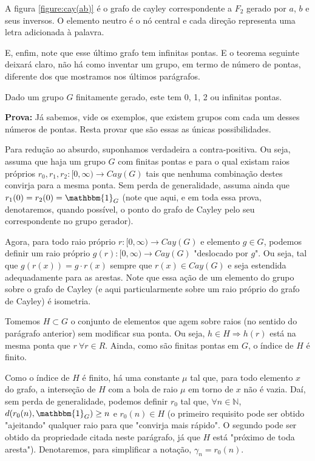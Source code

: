 A figura \ref{figure:cay(ab)} é o grafo de cayley correspondente a $F_2$ gerado por $a$, $b$ e seus inversos. O elemento neutro é o nó central e cada direção representa uma letra adicionada à palavra.



E, enfim, note que esse último grafo tem infinitas pontas. E o teorema seguinte deixará claro, não há como inventar um grupo, em termo de número de pontas, diferente dos que mostramos nos últimos parágrafos.

\begin{theorem}
Dado um grupo $G$ finitamente gerado, este tem 0, 1, 2 ou infinitas pontas.

\textbf{Prova:} Já sabemos, vide os exemplos, que existem grupos com cada um desses números de pontas. Resta provar que são essas as únicas possibilidades.

Para redução ao absurdo, suponhamos verdadeira a contra-positiva. Ou seja, assuma que haja um grupo $G$ com finitas pontas e para o qual existam raios próprios $r_0, r_1, r_2 : [0, \infty) \rightarrow Cay(G)$ tais que nenhuma combinação destes convirja para a mesma ponta. Sem perda de generalidade, assuma ainda que $r_1(0) = r_2(0) = \mathbbm{1}_G$ (note que aqui, e em toda essa prova, denotaremos, quando possível, o ponto do grafo de Cayley pelo seu correspondente no grupo gerador).

Agora, para todo raio próprio $r : [0, \infty) \rightarrow Cay(G)$ e elemento $g \in G$, podemos definir um raio próprio $g(r) : [0, \infty) \rightarrow Cay(G)$ "deslocado por $g$". Ou seja, tal que $g(r(x)) = g \cdot r(x)$ sempre que $r(x) \in Cay(G)$ e seja estendida adequadamente para as arestas. Note que essa ação de um elemento do grupo sobre o grafo de Cayley (e aqui particularmente sobre um raio próprio do grafo de Cayley) é isometria.

Tomemos $H \subset G$ o conjunto de elementos que agem sobre raios (no sentido do parágrafo anterior) sem modificar sua ponta. Ou seja, $h \in H \Rightarrow h(r)$ está na mesma ponta que $r \ \forall r \in R$. Ainda, como são finitas pontas em $G$, o índice de $H$ é finito.

Como o índice de $H$ é finito, há uma constante $\mu$ tal que, para todo elemento $x$ do grafo, a interseção de $H$ com a bola de raio $\mu$ em torno de $x$ não é vazia. Daí, sem perda de generalidade, podemos definir $r_0$ tal que, $\forall n \in \mathbb{N}$, $d(r_0(n), \mathbbm{1}_G) \geq n$ e $r_0(n) \in H$ (o primeiro requisito pode ser obtido "ajeitando" qualquer raio para que "convirja mais rápido". O segundo pode ser obtido da propriedade citada neste parágrafo, já que $H$ está "próximo de toda aresta"). Denotaremos, para simplificar a notação, $\gamma_n = r_0(n)$.


\end{theorem}
